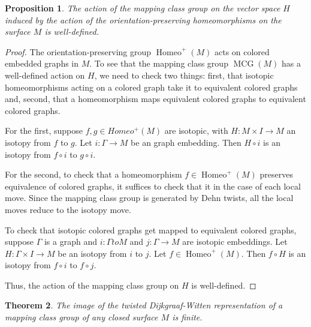 \documentclass{amsart}
\newtheorem{thm}{Theorem}[section]
\newtheorem{prop}[thm]{Proposition}
\DeclareMathOperator{\MCG}{MCG}
\DeclareMathOperator{\Homeo}{Homeo}
\begin{document}

\begin{prop}
The action of the mapping class group on the vector space $H$ induced by the action of the orientation-preserving homeomorphisms on the surface $M$ is well-defined.
\end{prop}
\begin{proof}
The orientation-preserving group $\Homeo^+(M)$ acts on colored embedded graphs in $M$.  To see that the mapping class group $\MCG(M)$ has a well-defined action on $H$, we need to check two things: first, that isotopic homeomorphisms acting on a colored graph take it to equivalent colored graphs and, second, that a homeomorphism maps equivalent colored graphs to equivalent colored graphs.

For the first, suppose $f, g \in Homeo^+(M)$ are isotopic, with $H: M \times I \to M$ an isotopy from $f$ to $g$.  Let $i: \Gamma \to M$ be an graph embedding.  Then $H \circ i$ is an isotopy from $f \circ i$ to $g \circ i$.    

For the second,  to check that a homeomorphism $f \in \Homeo^+(M)$ preserves equivalence of colored graphs, it suffices to check that it in the case of each local move.  Since the mapping class group is generated by Dehn twists, all the local moves reduce to the isotopy move. 

To check that isotopic colored graphs get mapped to equivalent colored graphs, suppose $\Gamma$ is a graph and $i: \Gamma to M$ and $j: \Gamma \to M$ are isotopic embeddings. Let $H: \Gamma \times I \to M$ be an isotopy from $i$ to $j$.  Let $f \in \Homeo^+(M)$.  Then $f \circ H$ is an isotopy from $f \circ i$ to $f \circ j$.  

Thus, the action of the mapping class group on $H$ is well-defined.
\end{proof}


\begin{thm}
The image of the twisted Dijkgraaf-Witten representation of a mapping class group of any closed surface $M$ is finite.
\end{thm}
\end{document}
